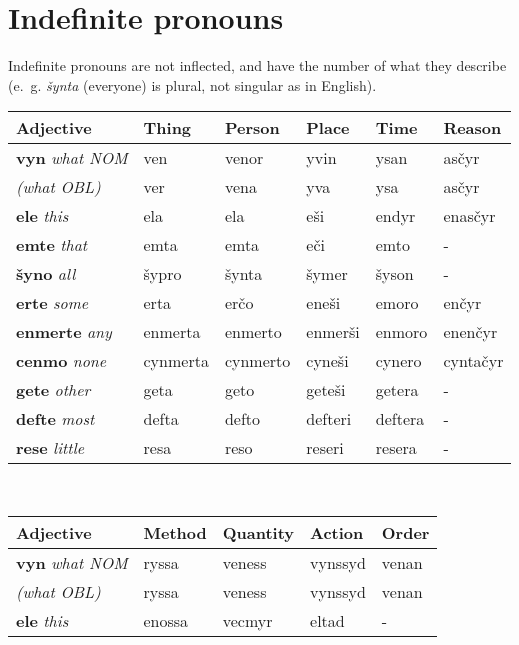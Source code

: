 \documentclass{book}
\begin{document}

\section{Indefinite pronouns}

Indefinite pronouns are not inflected, and have the number of what they describe (e.~g. \emph{šynta} (everyone) is plural, not singular as in English).

\begin{center}
  \begin{tabular}{|l|l|l|l|l|l|}
    \hline
    Adjective & Thing & Person & Place & Time & Reason\\ \hline
    \textbf{vyn} \emph{what NOM} & ven & venor & yvin & ysan & asčyr \\
    \emph{(what OBL)} & ver & vena & yva & ysa & asčyr \\
    \textbf{ele} \emph{this} & ela & ela & eši & endyr & enasčyr \\
    \textbf{emte} \emph{that} & emta & emta & eči & emto & - \\
    \textbf{šyno} \emph{all} & šypro & šynta & šymer & šyson & - \\
    \textbf{erte} \emph{some} & erta & erčo & eneši & emoro & enčyr \\
    \textbf{enmerte} \emph{any} & enmerta & enmerto & enmerši & enmoro & enenčyr \\
    \textbf{cenmo} \emph{none} & cynmerta & cynmerto & cyneši & cynero & cyntačyr \\
    \textbf{gete} \emph{other} & geta & geto & geteši & getera & - \\
    \textbf{defte} \emph{most} & defta & defto & defteri & deftera & - \\
    \textbf{rese} \emph{little} & resa & reso & reseri & resera & - \\ \hline
  \end{tabular}
  \\
  \begin{tabular}{|l|l|l|l|l|}
  	\hline
  	Adjective & Method & Quantity & Action & Order \\ \hline
  	\textbf{vyn} \emph{what NOM} & ryssa & veness & vynssyd & venan \\
  	\emph{(what OBL)} & ryssa & veness & vynssyd & venan \\
  	\textbf{ele} \emph{this} & enossa & vecmyr & eltad & - \\

\end{tabular}
\end{center}
\end{document}
